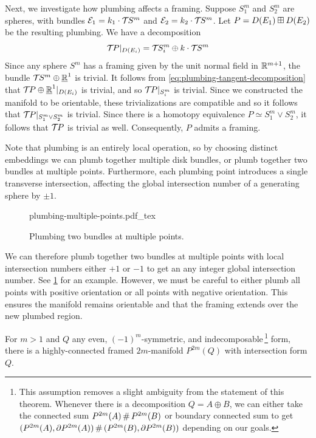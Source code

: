 Next, we investigate how plumbing affects a framing.
Suppose $S_1^m$ and $S_2^m$ are spheres, with bundles $\mathcal{E}_1 = k_1\cdot {\mathcal{T}\hspace{-0.1em}} S^m$ and $\mathcal{E}_2=k_2\cdot {\mathcal{T}\hspace{-0.1em}} S^m$. Let $P=D(E_1)\boxplus D(E_2)$ be the resulting plumbing. We have a decomposition
\begin{equation}\label{eq:plumbing-tangent-decomposition}
	{\mathcal{T}\hspace{-0.1em}} P|_{D(E_i)} = {\mathcal{T}\hspace{-0.1em}} S^m_i\oplus k\cdot {\mathcal{T}\hspace{-0.1em}} S^m
\end{equation}
Since any sphere $S^m$ has a framing given by the unit normal field in $\mathbb{R}^{m+1}$, the bundle ${\mathcal{T}\hspace{-0.1em}} S^m\oplus\underline{\mathbb{R}}^1$ is trivial.
It follows from \cref{eq:plumbing-tangent-decomposition} that ${\mathcal{T}\hspace{-0.1em}} P\oplus \underline{\mathbb{R}}^1|_{D(E_i)}$ is trivial, and so ${\mathcal{T}\hspace{-0.1em}} P|_{S_i^m}$ is trivial. Since we constructed the manifold to be orientable, these trivializations are compatible and so it follows that ${\mathcal{T}\hspace{-0.1em}} P|_{S_1^m\vee S_2^m}$ is trivial. Since there is a homotopy equivalence $P\simeq S_1^m\vee S_2^m$, it follows that ${\mathcal{T}\hspace{-0.1em}} P$ is trivial as well. Consequently, $P$ admits a framing.

Note that plumbing is an entirely local operation, so by choosing distinct embeddings we can plumb together multiple disk bundles, or plumb together two bundles at multiple points. Furthermore, each plumbing point introduces a single transverse intersection, affecting the global intersection number of a generating sphere by $\pm 1$.
\begin{figure}[ht]
	\centering
	{plumbing-multiple-points.pdf_tex}
	\caption{Plumbing two bundles at multiple points.}\label{fig:plumbing-at-multiple-points}
\end{figure}
We can therefore plumb together two bundles at multiple points with local intersection numbers either $+1$ or $-1$ to get an any integer global intersection number. See \cref{fig:plumbing-at-multiple-points} for an example. However, we must be careful to either plumb all points with positive orientation or all points with negative orientation. This ensures the manifold remains orientable and that the framing extends over the new plumbed region.

\begin{proposition}\label{thm:plumbing-existence-theorem}
	For $m>1$ and $Q$ any even, $(-1)^m$-symmetric, and indecomposable\,\footnote{This assumption removes a slight ambiguity from the statement of this theorem. Whenever there is a decomposition $Q=A\oplus B$, we can either take the connected sum $P^{2m}(A)\+P^{2m}(B)$ or boundary connected sum to get $(P^{2m}(A),\partial P^{2m}(A))\+ (P^{2m}(B),\partial P^{2m}(B))$ depending on our goals.} form, there is a highly-connected framed $2m$-manifold $P^{2m}(Q)$ with intersection form $Q$.
\end{proposition}

